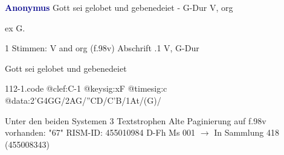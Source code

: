 \documentclass[twocolumn]{book}
\begin{document}
\newline \par \vspace{7pt} \textcolor{darkblue}{\textbf{Anonymus  }}
\newline Gott sei gelobet und gebenedeiet - G-Dur
\newline V, org
\newline \begin{itshape}[f.96r, at left:] ex G.\end{itshape} 
\newline \textcolor{darkblue}{}  1 Stimmen: V and org  (f.98v)
\newline Abschrift
.1  V, G-Dur
\newline \begin{footnotesize} Gott sei gelobet und gebenedeiet \end{footnotesize}  
\begin{filecontents*}{112-1.code}
@clef:C-1
@keysig:xF
@timesig:c
@data:2'G4GG/2AG/''CD/C'B/1At/(G)/
\end{filecontents*}
\newline
%
\newline Unter den beiden Systemen 3 Textstrophen
\newline Alte Paginierung auf f.98v vorhanden: "67"
\newline RISM-ID: 455010984
\newline D-Fh  Ms 001
\newline $\rightarrow$ In Sammlung 418 (455008343)
      
\end{document}
